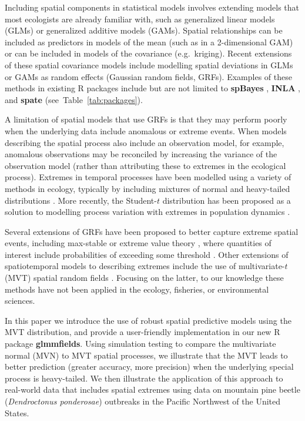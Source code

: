 \documentclass[12pt,english]{article}
\begin{document}
\begin{spacing}{1.9}
Including spatial components in statistical models involves extending models
that most ecologists are already familiar with, such as generalized linear
models (GLMs) or generalized additive models (GAMs). Spatial relationships can
be included as predictors in models of the mean (such as in a 2-dimensional GAM)
or can be included in models of the covariance (e.g.\ kriging). Recent
extensions of these spatial covariance models include modelling spatial
deviations in GLMs or GAMs as random effects (Gaussian random fields, GRFs).
Examples of these methods in existing R packages include but are not limited to
\textbf{spBayes} \citep{finley2007},
\textbf{INLA} \citep{rue2009}, and
\textbf{spate} \citep{sigrist2015} (see~Table~\ref{tab:packages}).

A limitation of spatial models that use GRFs is that they may perform poorly
when the underlying data include anomalous or extreme events. When models
describing the spatial process also include an observation model, for example,
anomalous observations may be reconciled by increasing the variance of the
observation model (rather than attributing these to extremes in the ecological
process). Extremes in temporal processes have been modelled using a variety of
methods in ecology, typically by including mixtures of normal and heavy-tailed
distributions \citep[e.g.][]{everitt1996, ward2007, thorson2011}. More recently,
the Student-$t$ distribution has been proposed as a solution to modelling
process variation with extremes in population dynamics \citep{anderson2017}.

Several extensions of GRFs have been proposed to better capture
extreme spatial events, including max-stable or extreme value theory
\citep{davison2012, davison2012a}, where quantities of interest include probabilities
of exceeding some threshold \citep{davis2008}. Other extensions of spatiotemporal
models to describing extremes include the use of multivariate-$t$ (MVT) spatial
random fields \citep{roislien2007}. Focusing on the latter, to our knowledge these
methods have not been applied in the ecology, fisheries, or environmental sciences.

In this paper we introduce the use of robust spatial predictive models using the
MVT distribution, and provide a user-friendly implementation in our new R
package \textbf{glmmfields}. Using simulation testing to compare the
multivariate normal (MVN) to MVT spatial processes, we illustrate that the MVT
leads to better prediction (greater accuracy, more precision) when the
underlying special process is heavy-tailed. We then illustrate the application
of this approach to real-world data that includes spatial extremes using data
on mountain pine beetle (\textit{Dendroctonus ponderosae}) outbreaks in the
Pacific Northwest of the United States.


\end{spacing}
\end{document}
